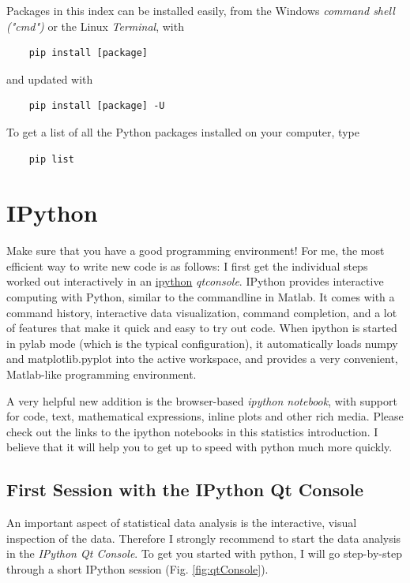 Packages in this index can be installed easily, from the Windows \emph{command shell ("cmd")} or the Linux \emph{Terminal}, with

\begin{lstlisting}
    pip install [package]
\end{lstlisting}

and updated with

\begin{lstlisting}
    pip install [package] -U
\end{lstlisting}

To get a list of all the Python packages installed on your computer, type

\begin{lstlisting}
    pip list
\end{lstlisting}


\section{IPython}

Make sure that you have a good programming environment! For me, the most efficient way to write new code is as follows: I first get the individual steps worked out interactively in an \href{http://ipython.org/}{ipython} \emph{qtconsole}. \Gls{IPython} provides interactive computing with Python, similar to the commandline in Matlab. It comes with a command history, interactive data visualization, command completion, and a lot of features that make it quick and easy to try out code. When ipython is started in \gls{pylab} mode (which is the typical configuration), it automatically loads numpy and matplotlib.pyplot into the active workspace, and provides a very convenient, Matlab-like programming environment.

A very helpful new addition is the browser-based \emph{ipython notebook}, with support for code, text, mathematical expressions, inline plots and other rich media. Please check out the links to the ipython
notebooks in this statistics introduction. I believe that it will  help you to get up to speed with python much more quickly.

\subsection{First Session with the IPython Qt Console}

An important aspect of statistical data analysis is the interactive, visual inspection of the data. Therefore I strongly recommend to start the data analysis in the \emph{IPython Qt Console}. To get you started with python, I will go step-by-step through a short IPython session (Fig. \ref{fig:qtConsole}).



